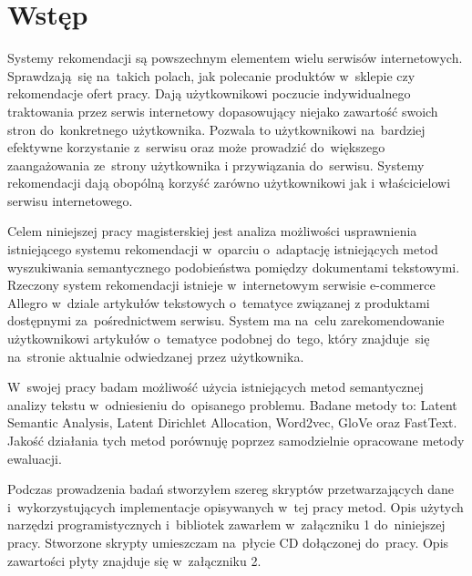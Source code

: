 \documentclass[pl]{minipw} %
\begin{document}
\makestatement


\cleardoublepage
\tableofcontents


\cleardoublepage
\pagestyle{fancy}

\chapter*{Wstęp}
Systemy rekomendacji są powszechnym elementem wielu serwisów internetowych. Sprawdzają~się na~takich polach, jak polecanie produktów w~sklepie czy rekomendacje ofert pracy. Dają użytkownikowi poczucie indywidualnego traktowania przez serwis internetowy dopasowujący niejako zawartość swoich stron do~konkretnego użytkownika. Pozwala to użytkownikowi na~bardziej efektywne korzystanie z~serwisu oraz może prowadzić do~większego zaangażowania ze~strony użytkownika i przywiązania do~serwisu. Systemy rekomendacji dają obopólną korzyść zarówno użytkownikowi jak i właścicielowi serwisu internetowego.

Celem niniejszej pracy magisterskiej jest analiza możliwości usprawnienia istniejącego systemu rekomendacji w~oparciu o~adaptację istniejących metod wyszukiwania semantycznego podobieństwa pomiędzy dokumentami tekstowymi. Rzeczony system rekomendacji istnieje w~internetowym serwisie e-commerce Allegro w~dziale artykułów tekstowych o~tematyce związanej z produktami dostępnymi za~pośrednictwem serwisu. System ma na~celu zarekomendowanie użytkownikowi artykułów o~tematyce podobnej do~tego, który znajduje~się na~stronie aktualnie odwiedzanej przez użytkownika.

W~swojej pracy badam możliwość użycia istniejących metod semantycznej analizy tekstu w~odniesieniu do~opisanego problemu. Badane metody to: Latent Semantic Analysis, Latent Dirichlet Allocation, Word2vec, GloVe oraz FastText. Jakość działania tych metod porównuję poprzez samodzielnie opracowane metody ewaluacji.

Podczas prowadzenia badań stworzyłem szereg skryptów przetwarzających dane i~wykorzystujących implementacje opisywanych w~tej pracy metod. Opis użytych narzędzi programistycznych i~bibliotek zawarłem w~załączniku 1 do~niniejszej pracy. Stworzone skrypty umieszczam na~płycie CD dołączonej do~pracy. Opis zawartości płyty znajduje się w~załączniku 2.
\end{document}
